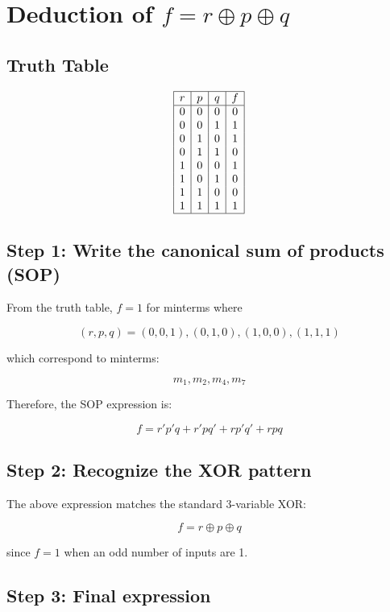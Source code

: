 \documentclass{article}
\begin{document}
\section*{Deduction of \(f = r \oplus p \oplus q\)}

\subsection*{Truth Table}

\[
\begin{array}{|c|c|c|c|}
\hline
r & p & q & f \\
\hline
0 & 0 & 0 & 0 \\
0 & 0 & 1 & 1 \\
0 & 1 & 0 & 1 \\
0 & 1 & 1 & 0 \\
1 & 0 & 0 & 1 \\
1 & 0 & 1 & 0 \\
1 & 1 & 0 & 0 \\
1 & 1 & 1 & 1 \\
\hline
\end{array}
\]

\subsection*{Step 1: Write the canonical sum of products (SOP)}

From the truth table, \(f=1\) for minterms where

\[
(r, p, q) = (0,0,1), (0,1,0), (1,0,0), (1,1,1)
\]

which correspond to minterms:

\[
m_1, m_2, m_4, m_7
\]

Therefore, the SOP expression is:

\[
f = r' p' q + r' p q' + r p' q' + r p q
\]

\subsection*{Step 2: Recognize the XOR pattern}

The above expression matches the standard 3-variable XOR:

\[
f = r \oplus p \oplus q
\]

since \(f=1\) when an odd number of inputs are 1.

\subsection*{Step 3: Final expression}
\end{document}
